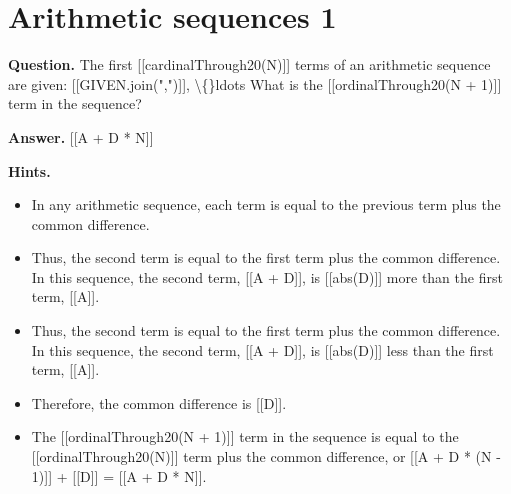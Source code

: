 \documentclass{article}
\begin{document}
\section*{Arithmetic sequences 1}
\textbf{Question.} The first [[cardinalThrough20(N)]] terms of an arithmetic sequence are given:
                [[GIVEN.join(",")]], \textbackslash\{\}ldots
                What is the [[ordinalThrough20(N + 1)]] term in the sequence?

\textbf{Answer.} [[A + D * N]]

\textbf{Hints.}
\begin{itemize}
  \item In any arithmetic sequence, each term is equal to the previous term plus the common difference.
  \item Thus, the second term is equal to the first term plus the common difference. In this sequence, the second term, [[A + D]], is [[abs(D)]] more than the first term, [[A]].
  \item Thus, the second term is equal to the first term plus the common difference. In this sequence, the second term, [[A + D]], is [[abs(D)]] less than the first term, [[A]].
  \item Therefore, the common difference is [[D]].
  \item The [[ordinalThrough20(N + 1)]] term in the sequence is equal to the [[ordinalThrough20(N)]] term plus the common difference, or [[A + D * (N - 1)]] + [[D]] = [[A + D * N]].
\end{itemize}
\end{document}
